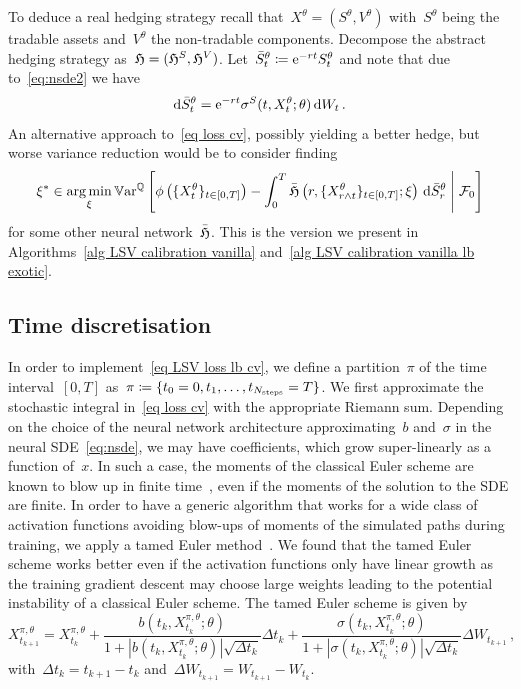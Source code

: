 To deduce a real hedging strategy recall that~$X^{\theta} = (S^\theta, V^\theta)$ with~$S^\theta$ being the tradable assets and~$V^\theta$ the non-tradable components.
Decompose the abstract hedging strategy as~$\mathfrak{H} = (\mathfrak{H}^S, \mathfrak{H}^V)$.
Let~$\bar S^{\theta}_t\coloneqq \mathrm{e}^{-rt}S^{\theta}_t$ and note that due to~\eqref{eq:nsde2} we have 
\[
\mathrm{d}\bar S^{\theta}_t = \mathrm{e}^{-rt}\sigma^S(t,X_t^{\theta};\theta)\,\mathrm{d} W_t\,.
\]
An alternative approach to~\eqref{eq loss cv}, possibly yielding a better hedge, but worse variance reduction would be to consider finding
\begin{equation}\label{eq loss cv real}
\xi^{\ast} \in  \operatorname*{arg\,min}_{\xi} \mathbb{V}\mathrm{ar}^{\mathbb{Q}}\left[\phi\left(\{X_t^\theta\}_{t\in[0,T]}\right) -  \int_0^T \bar {\mathfrak{H}}\left(r,\{X_{r\wedge t}^\theta\}_{t\in[0,T]}; \xi\right) \, \mathrm{d} \bar S^{\theta}_r \;\middle\vert \; \mathcal{F}_0\right]
\end{equation}
for some other neural network~$\bar{\mathfrak{H}}$. 
This is the version we present in Algorithms~\ref{alg LSV calibration vanilla} and~\ref{alg LSV calibration vanilla lb exotic}.

\subsection{Time discretisation}  
\sloppy In order to implement~\eqref{eq LSV loss lb cv}, we define a partition~$\pi$ of the time interval~$[0,T]$ as~${\pi \coloneqq \{t_0=0, t_1, \ldots, t_{N_{\text{steps}}}=T\}}$. We first approximate the stochastic integral in~\eqref{eq loss cv} with the appropriate Riemann sum. Depending on the choice of the neural network architecture approximating~$b$ and~$\sigma$ in the neural SDE~\eqref{eq:nsde}, we may have coefficients, which grow super-linearly as a function of~$x$. In such a case, the moments of the classical Euler scheme are known to blow up in finite time~\cite{Hutzenthaler2011StrongCoefficients}, even if the moments of the solution to the SDE are finite.
In order to have a generic algorithm that works for a wide class of activation functions avoiding blow-ups of moments of the simulated paths during training, we apply a tamed Euler method~\cite{Hutzenthaler2011StrongCoefficients, Szpruch2018V-integrabilitySDEs}. 
We found that the tamed Euler scheme works better even if the activation functions only have linear growth as the training gradient descent may choose large weights leading to the potential instability of a classical Euler scheme.
The tamed Euler scheme is given by
\begin{equation}
\label{eq tamed scheme}
X_{t_{k+1}}^{\pi, \theta} = X_{t_{k}}^{\pi, \theta} + \frac{b(t_k, X_{t_{k}}^{\pi, \theta};\theta)}{1+|b(t_k,X_{t_{k}}^{\pi, \theta};\theta) |\sqrt{\Delta t_k}} \Delta t_k +\frac{\sigma(t_k,X_{t_{k}}^{\pi, \theta}; \theta)}{1+|  \sigma(t_k,X_{t_{k}}^{\pi, \theta};\theta) |\sqrt{\Delta t_k}}\Delta W_{t_{k+1}}\,,
\end{equation}
with~$\Delta t_k = t_{k+1}-t_k$ and~$\Delta W_{t_{k+1}} = W_{t_{k+1}}- W_{t_{k}}$.

